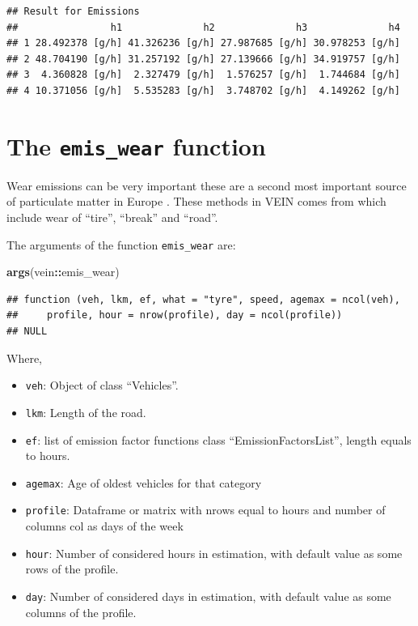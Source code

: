 \documentclass[12pt,graybox,envcountchap,sectrefs]{krantz}
\makeatletter
\newenvironment{Shaded}{\begin{snugshade}}{\end{snugshade}}
\newcommand{\KeywordTok}[1]{\textcolor[rgb]{0.13,0.29,0.53}{\textbf{#1}}}
\newcommand{\OperatorTok}[1]{\textcolor[rgb]{0.81,0.36,0.00}{\textbf{#1}}}
\newcommand{\NormalTok}[1]{#1}
\providecommand{\tightlist}{%
  \setlength{\itemsep}{0pt}\setlength{\parskip}{0pt}}
\newenvironment{kframe}{%
\medskip{}
\setlength{\fboxsep}{.8em}
 \def\at@end@of@kframe{}%
 \ifinner\ifhmode%
  \def\at@end@of@kframe{\end{minipage}}%
  \begin{minipage}{\columnwidth}%
 \fi\fi%
 \def\FrameCommand##1{\hskip\@totalleftmargin \hskip-\fboxsep
 \colorbox{shadecolor}{##1}\hskip-\fboxsep
     \hskip-\linewidth \hskip-\@totalleftmargin \hskip\columnwidth}%
 \MakeFramed {\advance\hsize-\width
   \@totalleftmargin\z@ \linewidth\hsize
   \@setminipage}}%
 {\par\unskip\endMakeFramed%
 \at@end@of@kframe}
\renewenvironment{Shaded}{\begin{kframe}}{\end{kframe}}
\theoremstyle{definition}
\theoremstyle{definition}
\theoremstyle{definition}
\theoremstyle{remark}
\makeatother
\begin{document}
\begin{verbatim}
## Result for Emissions 
##                h1              h2              h3              h4
## 1 28.492378 [g/h] 41.326236 [g/h] 27.987685 [g/h] 30.978253 [g/h]
## 2 48.704190 [g/h] 31.257192 [g/h] 27.139666 [g/h] 34.919757 [g/h]
## 3  4.360828 [g/h]  2.327479 [g/h]  1.576257 [g/h]  1.744684 [g/h]
## 4 10.371056 [g/h]  5.535283 [g/h]  3.748702 [g/h]  4.149262 [g/h]
\end{verbatim}

\section{\texorpdfstring{The \texttt{emis\_wear}
function}{The emis\_wear function}}\label{ew}

Wear emissions can be very important these are a second most important
source of particulate matter in Europe \citep{eear}. These methods in
VEIN comes from \citet{NtziachristosBoulter2009} which include wear of
``tire'', ``break'' and ``road''.

The arguments of the function \texttt{emis\_wear} are:

\begin{Shaded}
\begin{Highlighting}[]
\KeywordTok{args}\NormalTok{(vein}\OperatorTok{::}\NormalTok{emis_wear)}
\end{Highlighting}
\end{Shaded}

\begin{verbatim}
## function (veh, lkm, ef, what = "tyre", speed, agemax = ncol(veh), 
##     profile, hour = nrow(profile), day = ncol(profile)) 
## NULL
\end{verbatim}

Where,

\begin{itemize}
\tightlist
\item
  \texttt{veh}: Object of class ``Vehicles''.
\item
  \texttt{lkm}: Length of the road.
\item
  \texttt{ef}: list of emission factor functions class
  ``EmissionFactorsList'', length equals to hours.
\item
  \texttt{agemax}: Age of oldest vehicles for that category
\item
  \texttt{profile}: Dataframe or matrix with nrows equal to hours and
  number of columns col as days of the week
\item
  \texttt{hour}: Number of considered hours in estimation, with default
  value as some rows of the profile.
\item
  \texttt{day}: Number of considered days in estimation, with default
  value as some columns of the profile.
\end{itemize}
\end{document}
